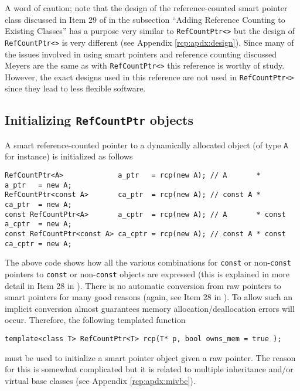 A word of caution; note that the design of the reference-counted smart
pointer class discussed in Item 29 of {}\cite{ref:meyers_1996} in the
subsection ``Adding Reference Counting to Existing Classes'' has a
purpose very similar to {}\texttt{RefCountPtr<>} but the design of
{}\texttt{RefCountPtr<>} is very different (see Appendix
{}\ref{rcp:apdx:design}).  Since many of the issues involved in using
smart pointers and reference counting discussed Meyers
{}\cite{ref:meyers_1996} are the same as with {}\texttt{RefCountPtr<>}
this reference is worthy of study.  However, the exact designs used in
this reference are not used in {}\texttt{RefCountPtr<>} since they
lead to less flexible software.

%
\subsection{Initializing {}\texttt{RefCountPtr} objects}
\label{rcp:sec:init-rcp-objects}
%

A smart reference-counted pointer to a dynamically allocated object
(of type {}\texttt{A} for instance) is initialized as follows

{\scriptsize\begin{verbatim}
RefCountPtr<A>             a_ptr   = rcp(new A); // A       *       a_ptr   = new A;
RefCountPtr<const A>       ca_ptr  = rcp(new A); // const A *       ca_ptr  = new A;
const RefCountPtr<A>       a_cptr  = rcp(new A); // A       * const a_cptr  = new A;
const RefCountPtr<const A> ca_cptr = rcp(new A); // const A * const ca_cptr = new A;
\end{verbatim}}

The above code shows how all the various combinations for
{}\texttt{const} or non-{}\texttt{const} pointers to {}\texttt{const}
or non-{}\texttt{const} objects are expressed (this is explained in
more detail in Item 28 in {}\cite{ref:meyers_1996}).  There is no
automatic conversion from raw pointers to smart pointers for many good
reasons (again, see Item 28 in {}\cite{ref:meyers_1996}).  To allow such
an implicit conversion almost guarantees memory
allocation/deallocation errors will occur.  Therefore, the following
templated function

{\scriptsize\begin{verbatim}
template<class T> RefCountPtr<T> rcp(T* p, bool owns_mem = true );
\end{verbatim}}

{}\noindent{}must be used to initialize a smart pointer object given a
raw pointer.  The reason for this is somewhat complicated but it is
related to multiple inheritance and/or virtual base classes (see
Appendix {}\ref{rcp:apdx:mivbc}).


